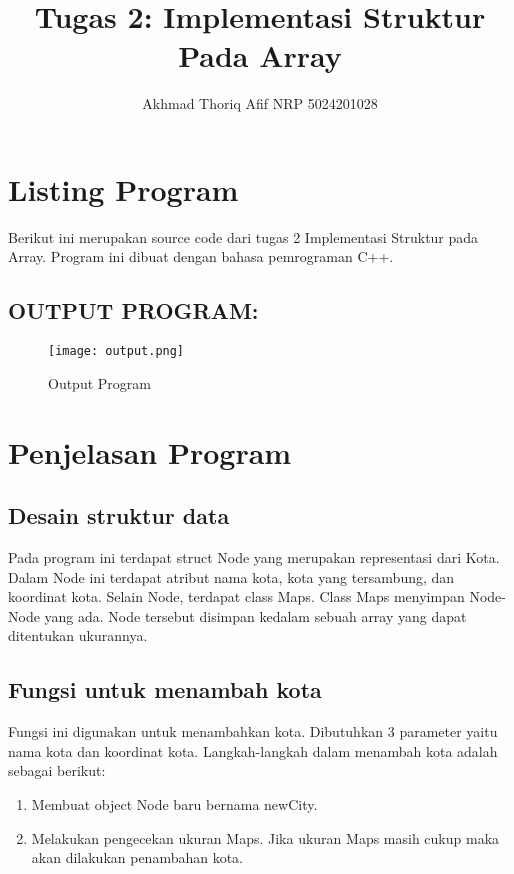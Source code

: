 \documentclass[]{article}
\title{Tugas 2: Implementasi Struktur Pada Array}
\author{Akhmad Thoriq Afif NRP 5024201028}
\begin{document}
\maketitle
\section{Listing Program}
Berikut ini merupakan source code dari tugas 2 Implementasi Struktur pada Array. Program ini dibuat dengan bahasa pemrograman C++.

\subsection*{OUTPUT PROGRAM:}
\begin{figure}[htp]
    \centering
    \texttt{[image: output.png]}
    \caption{Output Program}
    \label{fig:galaxy}
\end{figure}
\pagebreak
\section{Penjelasan Program}
\subsection{Desain struktur data}
\par
Pada program ini terdapat struct Node yang merupakan representasi dari Kota. Dalam Node ini terdapat atribut nama kota, kota yang tersambung, dan koordinat kota. Selain Node, terdapat class Maps. Class Maps menyimpan Node-Node yang ada. Node tersebut disimpan kedalam sebuah array yang dapat ditentukan ukurannya.
\subsection{Fungsi untuk menambah kota}

\par
Fungsi ini digunakan untuk menambahkan kota. Dibutuhkan 3 parameter yaitu nama kota dan koordinat kota. Langkah-langkah dalam menambah kota adalah sebagai berikut:
\begin{enumerate}
    \item Membuat object Node baru bernama newCity.
    \item Melakukan pengecekan ukuran Maps. Jika ukuran Maps masih cukup maka akan dilakukan penambahan kota.
\end{enumerate}
\end{document}
